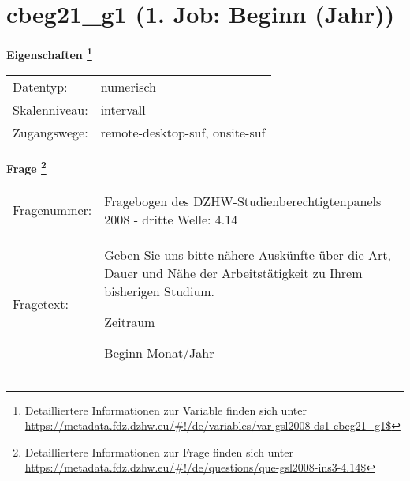 
    \setcounter{footnote}{0}

    \vspace*{-1.8cm}
	\section{cbeg21\_g1 (1. Job: Beginn (Jahr))}
	\label{section:cbeg21_g1}



    \vspace*{0.5cm}
    \noindent\textbf{Eigenschaften
	\footnote{Detailliertere Informationen zur Variable finden sich unter
		\url{https://metadata.fdz.dzhw.eu/\#!/de/variables/var-gsl2008-ds1-cbeg21_g1$}}}\\
	\begin{tabularx}{\hsize}{@{}lX}
	Datentyp: & numerisch \\
	Skalenniveau: & intervall \\
	Zugangswege: &
	  remote-desktop-suf, 
	  onsite-suf
 \\
    \end{tabularx}



				\vspace*{0.5cm}
                \noindent\textbf{Frage
	                \footnote{Detailliertere Informationen zur Frage finden sich unter
		              \url{https://metadata.fdz.dzhw.eu/\#!/de/questions/que-gsl2008-ins3-4.14$}}}\\
				\begin{tabularx}{\hsize}{@{}lX}
					Fragenummer: &
					  Fragebogen des DZHW-Studienberechtigtenpanels 2008 - dritte Welle:
					  4.14
 \\
					Fragetext: & Geben Sie uns bitte nähere Auskünfte über die Art, Dauer und Nähe der Arbeitstätigkeit zu Ihrem bisherigen Studium.\par  Zeitraum\par  Beginn Monat/Jahr \\
				\end{tabularx}





